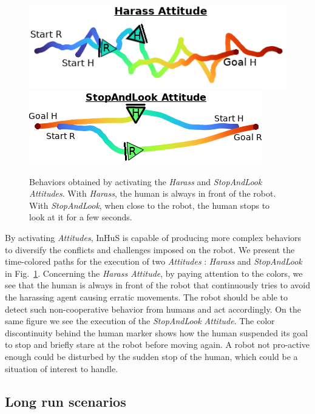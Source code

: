 \begin{figure}
    \centering
    \includegraphics[width=0.45\linewidth]{images/Chapter6/harass_colored_path_bis.png}
    \includegraphics[width=0.45\linewidth]{images/Chapter6/stoplook_colored_path_bis.png}
    \caption{
    Behaviors obtained by activating the \textit{Harass} and \textit{StopAndLook Attitudes}. 
    With \textit{Harass}, the human is always in front of the robot.
    With \textit{StopAndLook}, when close to the robot, the human stops to look at it for a few seconds.
    }
    \label{fig:attitudes}
    \vspace{-0.3cm}
\end{figure}

By activating \textit{Attitudes}, InHuS is capable of producing more complex behaviors to diversify the conflicts and challenges imposed on the robot.
We present the time-colored paths for the execution of two \textit{Attitudes} : \textit{Harass} and \textit{StopAndLook} in Fig.~\ref{fig:attitudes}. Concerning the \textit{Harass Attitude}, by paying attention to the colors, we see that the human is always in front of the robot that continuously tries to avoid the harassing agent causing erratic movements. The robot should be able to detect such non-cooperative behavior from humans and act accordingly.
On the same figure we see the execution of the \textit{StopAndLook Attitude}. The color discontinuity behind the human marker shows how the human suspended its goal to stop and briefly stare at the robot before moving again. A robot not pro-active enough could be disturbed by the sudden stop of the human, which could be a situation of interest to handle. 


\subsection{Long run scenarios}



